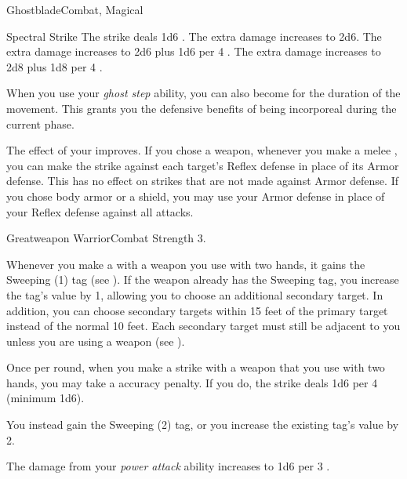 \begin{magicalfeat}{Ghostblade}{Combat, Magical}
\begin{magicalactiveability}{Spectral Strike}
            \rankline
             The strike deals 1d6 .
             The extra damage increases to 2d6.
             The extra damage increases to 2d6 plus 1d6 per 4 .
             The extra damage increases to 2d8 plus 1d8 per 4 .
        \end{magicalactiveability}

         When you use your \textit{ghost step} ability, you can also become  for the duration of the movement.
        This grants you the defensive benefits of being incorporeal during the current phase.

         The effect of your  improves.
        If you chose a weapon, whenever you make a melee , you can make the strike against each target's Reflex defense in place of its Armor defense.
        This has no effect on strikes that are not made against Armor defense.
        If you chose body armor or a shield, you may use your Armor defense in place of your Reflex defense against all attacks.
    \end{magicalfeat}

    \begin{feat}{Greatweapon Warrior}{Combat}
        \featpre Strength 3.

         Whenever you make a   with a weapon you use with two hands, it gains the Sweeping (1) tag (see ).
        If the weapon already has the Sweeping tag, you increase the tag's value by 1, allowing you to choose an additional secondary target.
        In addition, you can choose secondary targets within 15 feet of the primary target instead of the normal 10 feet.
        Each secondary target must still be adjacent to you unless you are using a  weapon (see ).

         Once per round, when you make a  strike with a weapon that you use with two hands, you may take a  accuracy penalty.
        If you do, the strike deals 1d6  per 4  (minimum 1d6).

         You instead gain the Sweeping (2) tag, or you increase the existing tag's value by 2.

         The damage from your \textit{power attack} ability increases to 1d6 per 3 .
    \end{feat}

